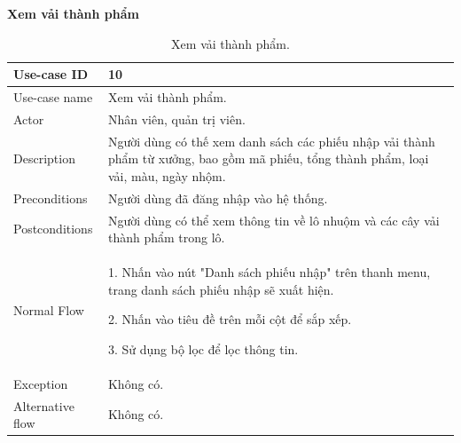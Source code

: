 \textbf{Xem vải thành phẩm}
\begin{table}[!htp]
    \centering
    \begin{tabular}{|m{3cm}|m{10cm}|}
    \hline 
        Use-case ID & 10\\ \hline
        Use-case name & Xem vải thành phẩm.\\ \hline
        Actor & Nhân viên, quản trị viên.\\ \hline
        Description & Người dùng có thế xem danh sách các phiếu nhập vải thành phẩm từ xưởng, bao gồm mã phiếu, tổng thành phẩm, loại vải, màu, ngày nhộm.\\ \hline
        Preconditions & Người dùng đã đăng nhập vào hệ thống.\\ \hline
        Postconditions & Người dùng có thể xem thông tin về lô nhuộm và các cây vải thành phẩm trong lô.\\ \hline
        Normal Flow & 
        1. Nhấn vào nút "Danh sách phiếu nhập" trên thanh menu, trang danh sách phiếu nhập sẽ xuất hiện.\par
        2. Nhấn vào tiêu đề trên mỗi cột để sắp xếp.\par
        3. Sử dụng bộ lọc để lọc thông tin.
        \\ \hline
        Exception & Không có.\\ \hline
        Alternative flow & Không có.\\ 
    \hline 
    \end{tabular}
    \caption{Xem vải thành phẩm.}
    \label{bang10}
\end{table}

